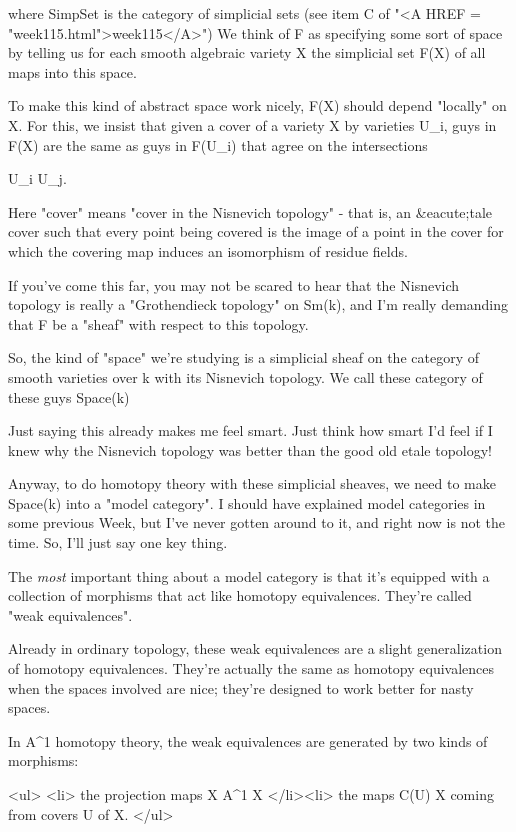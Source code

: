 where SimpSet is the category of simplicial sets (see item C of
"<A HREF = "week115.html">week115</A>") We think of F as
specifying some sort of space by telling us for each smooth algebraic
variety X the simplicial set F(X) of all maps into this space.

To make this kind of abstract space work nicely, F(X) should
depend "locally" on X.  For this, we insist that given a cover 
of a variety X by varieties U_{i}, guys in F(X) are the same as
guys in F(U_{i}) that agree on the intersections 

U_{i} \cap  U_{j}.

Here "cover" means "cover in the Nisnevich
topology" - that is, an &eacute;tale cover such that every point being
covered is the image of a point in the cover for which the covering
map induces an isomorphism of residue fields.

If you've come this far, you may not be scared to hear that the
Nisnevich topology is really a "Grothendieck topology" on Sm(k),
and I'm really demanding that F be a "sheaf" with respect to this
topology.

So, the kind of "space" we're studying is a simplicial sheaf on 
the category of smooth varieties over k with its Nisnevich 
topology.  We call these category of these guys Space(k)

Just saying this already makes me feel smart.  Just think how
smart I'd feel if I knew why the Nisnevich topology was better
than the good old etale topology!

Anyway, to do homotopy theory with these simplicial sheaves, we 
need to make Space(k) into a "model category".  I should have 
explained model categories in some previous Week, but I've never 
gotten around to it, and right now is not the time.  So, I'll 
just say one key thing.

The \emph{most} important thing about a model category is that 
it's equipped with a collection of morphisms that act 
like homotopy equivalences.  They're called "weak equivalences".

Already in ordinary topology, these weak equivalences are a
slight generalization of homotopy equivalences.  They're
actually the same as homotopy equivalences when the spaces
involved are nice; they're designed to work better for nasty 
spaces.

In A^{1} homotopy theory, the weak equivalences are generated
by two kinds of morphisms:

<ul>
<li>
the projection maps X \times  A^{1} \to  X
</li><li>
the maps C(U) \to  X coming from covers U of X.
</ul>

